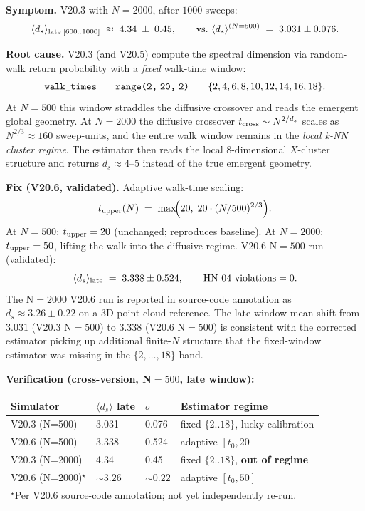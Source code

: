 \documentclass[12pt, a4paper]{article}
\begin{document}
\begin{formalbox}[title={FIND-AM03: Simulator Estimator Scaling Bias}]
\textbf{Symptom.} V20.3 with $N=2000$, after $1000$ sweeps:
\[
  \langle d_s \rangle_{\rm late\;[600..1000]} \;\approx\; 4.34
  \;\pm\; 0.45,
  \qquad \text{vs.\ } \langle d_s \rangle^{(N=500)} \;=\; 3.031 \pm 0.076.
\]

\textbf{Root cause.} V20.3 (and V20.5) compute the spectral dimension
via random-walk return probability with a \emph{fixed} walk-time
window:
\[
  \texttt{walk\_times} \;=\; \texttt{range(2,\;20,\;2)}
  \;=\; \{2,4,6,8,10,12,14,16,18\}.
\]
At $N=500$ this window straddles the diffusive crossover and reads
the emergent global geometry. At $N=2000$ the diffusive crossover
$t_{\rm cross} \sim N^{2/d_s}$ scales as $N^{2/3} \approx 160$
sweep-units, and the entire walk window remains in the
\emph{local k-NN cluster regime}. The estimator then reads the local
$8$-dimensional $X$-cluster structure and returns
$d_s \approx 4$--$5$ instead of the true emergent geometry.

\textbf{Fix (V20.6, validated).} Adaptive walk-time scaling:
\[
  t_{\rm upper}(N) \;=\; \max\!\Bigl(20,\; 20 \cdot (N/500)^{2/3}\Bigr).
\]
At $N=500$: $t_{\rm upper} = 20$ (unchanged; reproduces baseline).
At $N=2000$: $t_{\rm upper} = 50$, lifting the walk into the
diffusive regime. V20.6 N$=500$ run (validated):
\[
  \langle d_s \rangle_{\rm late} \;=\; 3.338 \pm 0.524,
  \qquad \text{HN-04 violations} = 0.
\]
The N$=2000$ V20.6 run is reported in source-code annotation as
$d_s \approx 3.26 \pm 0.22$ on a $3$D point-cloud reference. The
late-window mean shift from $3.031$ (V20.3 N$=500$) to $3.338$
(V20.6 N$=500$) is consistent with the corrected estimator picking
up additional finite-$N$ structure that the fixed-window estimator
was missing in the $\{2,\ldots,18\}$ band.

\textbf{Verification (cross-version, N$=500$, late window):}
\begin{center}
\renewcommand{\arraystretch}{1.30}
\begin{tabular}{p{3.0cm} p{2.5cm} p{2.5cm} p{4.0cm}}
\toprule
\textbf{Simulator} & \textbf{$\langle d_s \rangle$ late}
                   & \textbf{$\sigma$}
                   & \textbf{Estimator regime} \\
\midrule
V20.3 (N=500)    & 3.031 & 0.076 & fixed $\{2..18\}$, lucky calibration \\
V20.6 (N=500)    & 3.338 & 0.524 & adaptive $[t_0, 20]$ \\
V20.3 (N=2000)   & 4.34  & 0.45  & fixed $\{2..18\}$, \textbf{out of regime} \\
V20.6 (N=2000)$^\star$ & $\sim 3.26$ & $\sim 0.22$ & adaptive $[t_0, 50]$ \\
\bottomrule
\multicolumn{4}{l}{\footnotesize $^\star$Per V20.6 source-code
annotation; not yet independently re-run.} \\
\end{tabular}
\end{center}


\end{formalbox}
\end{document}
